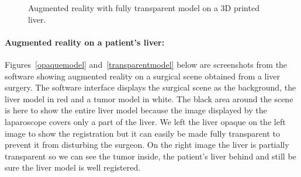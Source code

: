 \documentclass[12pt]{report}
\begin{document}
\begin{figure}[H]
\caption{Augmented reality with fully transparent model on a 3D printed liver.}
\label{fullytransparentmodelPLA}
\endminipage
\end{figure}


\paragraph{Augmented reality on a patient's liver:}
	Figures~\ref{opaquemodel} and~\ref{transparentmodel} below are screenshots from the software showing augmented reality on a surgical scene obtained from a liver surgery. The software interface displays the surgical scene as the background, the liver model in red and a tumor model in white. The black area around the scene is here to show the entire liver model because the image displayed by the laparoscope covers only a part of the liver. We left the liver opaque on the left image to show the registration but it can easily be made fully transparent to prevent it from disturbing the surgeon. On the right image the liver is partially transparent so we can see the tumor inside, the patient's liver behind and still be sure the liver model is well registered.
\end{document}
